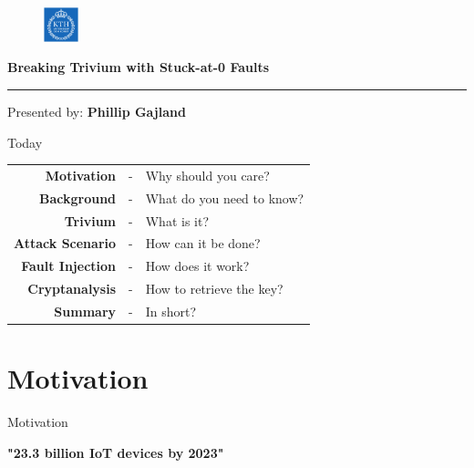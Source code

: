 \documentclass[10pt, compress]{beamer}
\begin{document}
\begin{frame}[plain,t]
\begin{figure}
\begin{flushright}
\vspace{-2cm}
\includegraphics[width = 10mm]{figures/kth_logo.png}
\end{flushright}
\end{figure}

\vspace{2cm}

{\large\textbf{Breaking Trivium with Stuck-at-0 Faults}}
\\\rule{7.5cm}{1pt}

\vspace{0.5cm}

{\large Presented by: \textbf{Phillip Gajland}}

\begin{figure}

\end{figure}
\end{frame}

\begin{frame}{Today}
\begin{table}
\def\arraystretch{1.2}
\raggedright
\begin{tabular}{r c l}
\textbf{Motivation} &-& Why should you care?\\
\textbf{Background} &-& What do you need to know?\\
\textbf{Trivium} &-& What is it?\\
\textbf{Attack Scenario} &-& How can it be done?\\
\textbf{Fault Injection} &-& How does it work?\\
\textbf{Cryptanalysis} &-& How to retrieve the key?\\
\textbf{Summary} &-& In short?
\end{tabular}
\end{table}
\end{frame}

\section{Motivation}

\begin{frame}{Motivation}
\vspace{1cm}
\begin{center}
\centering
{\LARGE\textbf{"23.3 billion IoT devices by 2023"}}\cite{iot}
\end{center}
\end{frame}
\end{document}
